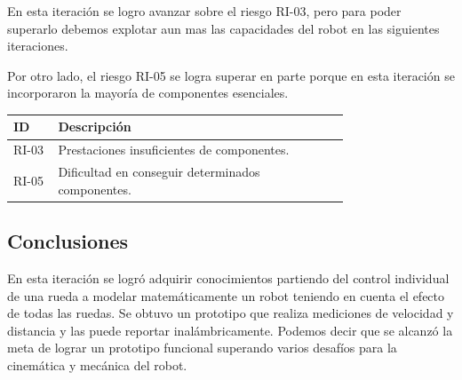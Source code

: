 En esta iteración se logro avanzar sobre el riesgo RI-03, pero para poder superarlo debemos explotar aun mas las capacidades del robot en las siguientes iteraciones.

Por otro lado, el riesgo RI-05 se logra superar en parte porque en esta iteración se incorporaron la mayoría de componentes esenciales.

\begin{center} \begin{tabular}{|p{0.10\linewidth}|p{0.65\linewidth}|}
\hline \rowcolor{test_header_color}
    ID & Descripción \\ 
\hline
    RI-03 & Prestaciones insuficientes de componentes. \\
\hline
    RI-05 & Dificultad en conseguir determinados componentes. \\
\hline
\end{tabular} \end{center}

\subsection{Conclusiones}

En esta iteración se logró adquirir conocimientos partiendo del control individual de una rueda a modelar matemáticamente un robot teniendo en cuenta el efecto de todas las ruedas. Se obtuvo un prototipo que realiza mediciones de velocidad y distancia y las puede reportar inalámbricamente. Podemos decir que se alcanzó la meta de lograr un prototipo funcional superando varios desafíos para la cinemática y mecánica del robot.